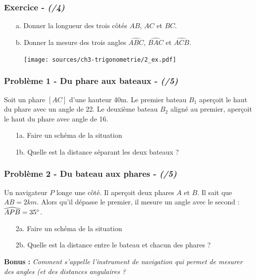 \documentclass[11pt]{article}
\begin{document}
\begin{multicols}{2}

\subsubsection*{Exercice - \textit{(/4)}}

\begin{enumerate}
\item[a.] Donner la longueur des trois côtés $AB$, $AC$ et $BC$.
\item[b.] Donner la mesure des trois angles $\widehat{ABC}$, $\widehat{BAC}$ et $\widehat{ACB}$.
\end{enumerate}

  \begin{figure}[H]
    \centering
    \texttt{[image: sources/ch3-trigonometrie/2\_ex.pdf]}
  \end{figure}


\end{multicols}

\subsubsection*{Problème 1 - Du phare aux bateaux  - \textit{(/5)}}
Soit un phare $[AC]$ d'une hauteur 40m. Le premier bateau $B_1$ aperçoit le haut du phare avec un angle de 22\degree. Le deuxième bateau $B_2$ aligné au premier, aperçoit le haut du phare avec angle de 16\degree.

\begin{enumerate}
\item[1a.] Faire un schéma de la situation
\item[1b.] Quelle est la distance séparant les deux bateaux ?
\end{enumerate}

\subsubsection*{Problème 2 - Du bateau aux phares - \textit{(/5)}}

Un navigateur $P$ longe une côté. Il aperçoit deux phares $A$ et $B$. Il sait que $AB = 2km$. Alors qu'il dépasse le premier, il mesure un angle avec le second : $\widehat{APB} = 35\degree$.

\begin{enumerate}
\item[2a.] Faire un schéma de la situation
\item[2b.] Quelle est la distance entre le bateau et chacun des phares ?
\end{enumerate}


\textbf{Bonus : } \textit{Comment s'appelle l'instrument de navigation qui permet de mesurer des angles (et des distances angulaires ?}
\end{document}
